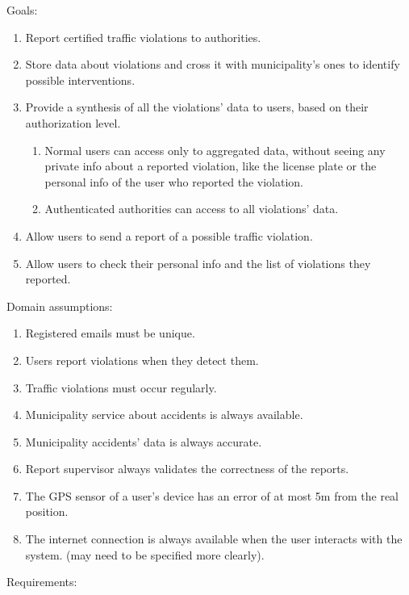 \bigskip
Goals:
\begin{enumerate}[label={G\arabic*.}]
    \item Report certified traffic violations to authorities.
    \item Store data about violations and cross it with municipality's ones to identify possible interventions.
    \item Provide a synthesis of all the violations' data to users, based on their authorization level.
    \begin{enumerate}[label={G\arabic{enumi}.\arabic*.}]
    	\item Normal users can access only to aggregated data, without seeing any private info about a reported violation, like the license plate or the personal info of the user who reported the violation.
    	\item Authenticated authorities can access to all violations' data.
    \end{enumerate}
	\item Allow users to send a report of a possible traffic violation.
	\item Allow users to check their personal info and the list of violations they reported.
\end{enumerate}
Domain assumptions:
\begin{enumerate}[label={D\arabic*.}]
	\item Registered emails must be unique.
    \item Users report violations when they detect them.
    \item Traffic violations must occur regularly.
    \item Municipality service about accidents is always available.
   	\item Municipality accidents' data is always accurate.
    \item Report supervisor always validates the correctness of the reports.
    \item The GPS sensor of a user's device has an error of at most 5m from the real position.
    \item The internet connection is always available when the user interacts with the system. (may need to be specified more clearly).
\end{enumerate}
Requirements:
